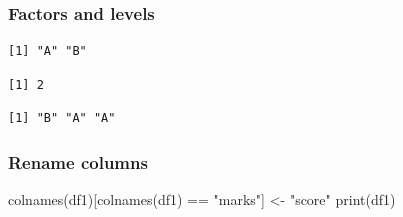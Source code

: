 \documentclass[
  letterpaper,
  DIV=11,
  numbers=noendperiod]{scrartcl}
\newenvironment{Shaded}{\begin{snugshade}}{\end{snugshade}}
\newcommand{\FunctionTok}[1]{\textcolor[rgb]{0.28,0.35,0.67}{#1}}
\newcommand{\NormalTok}[1]{\textcolor[rgb]{0.00,0.23,0.31}{#1}}
\newcommand{\OtherTok}[1]{\textcolor[rgb]{0.00,0.23,0.31}{#1}}
\newcommand{\SpecialCharTok}[1]{\textcolor[rgb]{0.37,0.37,0.37}{#1}}
\newcommand{\StringTok}[1]{\textcolor[rgb]{0.13,0.47,0.30}{#1}}
\begin{document}
\subsubsection{Factors and levels}\label{factors-and-levels}

\begin{Shaded}
\end{Shaded}

\begin{verbatim}
[1] "A" "B"
\end{verbatim}

\begin{Shaded}
\end{Shaded}

\begin{verbatim}
[1] 2
\end{verbatim}

\begin{Shaded}
\end{Shaded}

\begin{verbatim}
[1] "B" "A" "A"
\end{verbatim}

\subsubsection{Rename columns}\label{rename-columns}

\begin{Shaded}
\begin{Highlighting}[]
\FunctionTok{colnames}\NormalTok{(df1)[}\FunctionTok{colnames}\NormalTok{(df1) }\SpecialCharTok{==} \StringTok{"marks"}\NormalTok{] }\OtherTok{\textless{}{-}} \StringTok{"score"}
\FunctionTok{print}\NormalTok{(df1)}
\end{Highlighting}
\end{Shaded}
\end{document}
